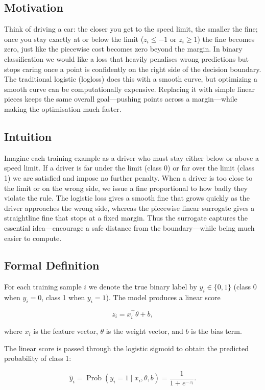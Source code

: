 \documentclass[12pt, a4paper]{article}
\providecommand{\operatorname}[1]{\mathop{\mathrm{#1}}\nolimits}
\begin{document}
\subsection{Motivation}
Think of driving a car: the closer you get to the speed limit, the smaller the fine; once you stay exactly at or below the limit (\(z_i \le -1\) or \(z_i \ge 1\)) the fine becomes zero, just like the piecewise cost becomes zero beyond the margin.  
In binary classification we would like a loss that heavily penalises wrong predictions but stops caring once a point is confidently on the right side of the decision boundary.  
The traditional logistic (logloss) does this with a smooth curve, but optimizing a smooth curve can be computationally expensive.  
Replacing it with simple linear pieces keeps the same overall goal---pushing points across a margin---while making the optimisation much faster.

\subsection{Intuition}
Imagine each training example as a driver who must stay either below or above a speed limit.  
If a driver is far under the limit (class 0) or far over the limit (class 1) we are satisfied and impose no further penalty.  
When a driver is too close to the limit or on the wrong side, we issue a fine proportional to how badly they violate the rule.  
The logistic loss gives a smooth fine that grows quickly as the driver approaches the wrong side, whereas the piecewise linear surrogate gives a straightline fine that stops at a fixed margin.  
Thus the surrogate captures the essential idea---encourage a safe distance from the boundary---while being much easier to compute.

\subsection{Formal Definition}
For each training sample \(i\) we denote the true binary label by \(y_i\in\{0,1\}\) (class 0 when \(y_i=0\), class 1 when \(y_i=1\)).  
The model produces a linear score  

\[
z_i = x_i^{\top}\theta + b,
\] 

where \(x_i\) is the feature vector, \(\theta\) is the weight vector, and \(b\) is the bias term.  

The linear score is passed through the logistic sigmoid to obtain the predicted probability of class 1:  

\[
\hat{y}_i = \operatorname{Prob}(y_i=1\mid x_i,\theta,b)=\frac{1}{1+e^{-z_i}}.
\]  
\end{document}
